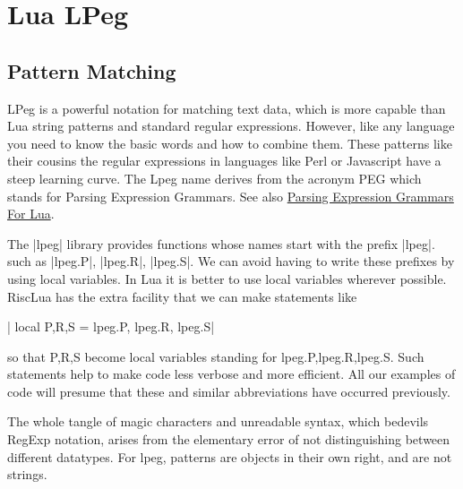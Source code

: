 \makeatletter
\long{}

   
\newenvironment{docLpeg}[1]{
  \auxm#1;
  }  
{%
\@@par
\smallskip\parindent=1em }
\makeatother

\chapter{Lua LPeg}

\section{Pattern Matching}
\parskip6pt

LPeg is a powerful notation for matching text data, which is more capable than Lua string patterns and standard regular expressions. However, like any language you need to know the basic words and how to combine them. These patterns like their  cousins the regular expressions in languages like Perl or Javascript have a steep learning curve. The Lpeg name derives from the acronym PEG which stands for Parsing Expression Grammars. 
See also \href{http://www.inf.puc-rio.br/~roberto/lpeg/}{Parsing Expression Grammars For Lua}. 

The |lpeg| library provides functions whose names start with the prefix |lpeg|. such as |lpeg.P|, |lpeg.R|, |lpeg.S|. We can avoid having to write these prefixes by using local variables. In Lua it is better to use local variables wherever possible. RiscLua has the extra facility that we can make statements like

|   local P,R,S = lpeg.P, lpeg.R, lpeg.S|

so that P,R,S become local variables standing for lpeg.P,lpeg.R,lpeg.S. Such statements help to make code less verbose and more efficient. All our examples of code will presume that these and similar abbreviations have occurred previously.

The whole tangle of magic characters and unreadable syntax, which bedevils RegExp notation, arises from the elementary error of not distinguishing between different datatypes. For lpeg, patterns are objects in their own right, and are not strings. 

